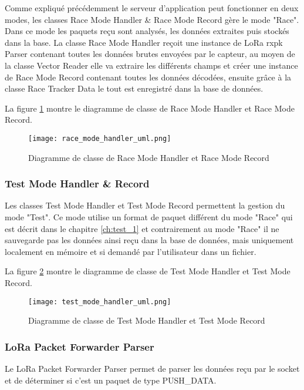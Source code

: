Comme expliqué précédemment le serveur d'application peut fonctionner en deux modes, les classes Race Mode Handler \& Race Mode Record gère le mode "Race". Dans ce mode les paquets reçu sont analysés, les données extraites puis  stockés dans la base. La classe Race Mode Handler reçoit une instance de LoRa rxpk Parser contenant toutes les données brutes envoyées par le capteur, au moyen de la classe Vector Reader elle va extraire les différents champs et créer une instance de Race Mode Record contenant toutes les données décodées, ensuite grâce à la classe Race Tracker Data le tout est enregistré dans la base de données.

La figure \ref{fig:race_mode_handler_uml} montre le diagramme de classe de Race Mode Handler et Race Mode Record.

\begin{figure}[htb]
\centering 
\texttt{[image: race\_mode\_handler\_uml.png]} 
\caption{Diagramme de classe de Race Mode Handler et Race Mode Record}
\label{fig:race_mode_handler_uml}
 \end{figure}

\subsubsection{Test Mode Handler \& Record}

Les classes Test Mode Handler et Test Mode Record permettent la gestion du mode "Test". Ce mode utilise un format de paquet différent du mode "Race" qui est décrit dans le chapitre \ref{ch:test_1} et contrairement au mode "Race" il ne sauvegarde pas les données ainsi reçu dans la base de données, mais uniquement localement en mémoire et si demandé par l'utilisateur dans un fichier.

La figure \ref{fig:test_mode_handler_uml} montre le diagramme de classe de Test Mode Handler et Test Mode Record.

\begin{figure}[htb]
\centering 
\texttt{[image: test\_mode\_handler\_uml.png]} 
\caption{Diagramme de classe de Test Mode Handler et Test Mode Record}
\label{fig:test_mode_handler_uml}
 \end{figure}

\subsubsection{LoRa Packet Forwarder Parser}

Le LoRa Packet Forwarder Parser permet de parser les données reçu par le socket et de déterminer si c'est un paquet de type PUSH\_DATA.

